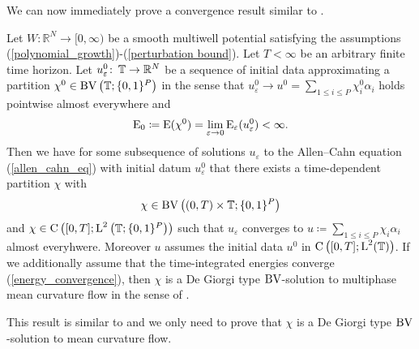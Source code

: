 We can now immediately prove a convergence result similar to
.
\begin{theorem}
	\label{convergence_to_de_giorgis_multiphase_mcf}
	Let $ W \colon \mathbb{ R }^{ N } \to [ 0, 
	\infty ) $ be a smooth multiwell potential satisfying the assumptions 
	(\ref{polynomial_growth})-(\ref{perturbation bound}). Let $ T < \infty 
	$ be an arbitrary finite time horizon. Let 
	$ u_{ \varepsilon }^{ 0 } \colon \operatorname{\mathbb{T}} \to \mathbb{ R }^{ N } $ be a 
	sequence of initial data
	approximating a partition 
	$ \chi^{ 0 } \in \operatorname{BV} \left( \operatorname{\mathbb{T}} ; \{ 0 , 1 \}^{ P } \right) $ 
	in the sense that 
	$ u_{ \varepsilon }^{ 0 } \to u^{ 0 } =  \sum_{ 1 \leq i \leq P } 
	\chi_{ i }^{ 0 } \alpha_{ i } $ 
	holds pointwise almost everywhere and 
	\begin{equation*} 
		\operatorname{E}_{ 0 } 
		\coloneqq 
		\operatorname{E} ( \chi^{ 0 } ) 
		= 
		\lim_{ \varepsilon \to 0 } 
		\operatorname{E}_{ \varepsilon } ( u_{ \varepsilon }^{ 0 } ) 
		< 
		\infty.
	\end{equation*}
	Then we have for 
	some subsequence of solutions $ u_{\varepsilon } $ to the Allen--Cahn 
	equation
	(\ref{allen_cahn_eq})  with initial datum $ u_{ 
		\varepsilon }^{ 0 } $ that there exists a time-dependent partition $ 
		\chi $ 
	with 
	\begin{equation*}
	\chi \in \operatorname{BV} \left( ( 0 , T ) \times \operatorname{\mathbb{T}} ; \{ 0 , 1 \}^{ P } 
	\right) 
	\end{equation*} and
	$ \chi 
	\in \operatorname{C} \left( [ 0 , T ] ; \operatorname{L}^{ 2 } \left( \operatorname{\mathbb{T}} ;  \{ 0 , 1 
	\}^{ P } \right) \right) $ such that $ u_{ \varepsilon } $ converges to 
	$ u \coloneqq \sum_{ 1 \leq i \leq P } \chi_{ i } \alpha_{ i } $ almost 
	everyhwere. Moreover $ u $ assumes the initial data $ u^{ 0 } $ in $ 
	\operatorname{C} \left( [ 0, T ] ; \operatorname{L}^{ 2 }( \operatorname{\mathbb{T}} ) \right) $. If we 
	additionally assume that the 
	time-integrated energies converge (\ref{energy_convergence}), then $ 
	\chi $ is a De Giorgi type $ \operatorname{BV} $-solution to multiphase mean curvature 
	flow in the sense 
	of 
	.
\end{theorem} 

This result is similar to  and we only need 
to prove that $ \chi $ is a De Giorgi type $ \operatorname{BV} $-solution to mean curvature 
flow.


